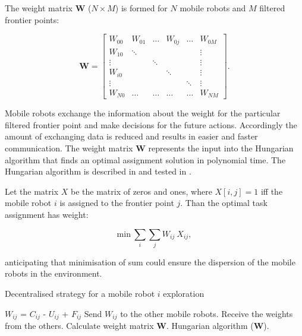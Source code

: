 \documentclass[letterpaper, 10 pt, conference]{ieeeconf}  %
\begin{document}
The weight matrix $\boldsymbol{W}$ ($N\times M$) is formed for $N$ mobile robots and $M$ filtered frontier points: 

\begin{equation}
    \boldsymbol{W} = \begin{bmatrix}
    W_{00} & W_{01} & \hdots & W_{0j} & \hdots & W_{0M}\\
    W_{10} & \ddots & & & & \vdots\\
    \vdots & & \ddots & & &  \vdots \\
    W_{i0} & & & \ddots & & \vdots \\
    \vdots & & & & \ddots & \vdots\\
    W_{N0} & \hdots  & \hdots  & \hdots  & \hdots &    W_{NM}
    \end{bmatrix}.
\end{equation}

Mobile robots exchange the information about the weight for the particular filtered frontier point and make decisions for the future actions. Accordingly the amount of exchanging data is reduced and results in easier and faster communication.
The weight matrix $\boldsymbol{W}$ represents the input into the Hungarian algorithm that finds an optimal assignment solution in polynomial time. The Hungarian algorithm is described in \cite{hungarian} and tested in \cite{comparison}. 

Let the matrix $X$ be the matrix of zeros and ones, where $X[i,j]=1$ iff the mobile robot $i$ is assigned to the frontier point $j$.
Than the optimal task assignment has weight:

\begin{equation}
     {\mathrm{min}}\ \sum_{i} \sum_{j} W_{ij}\ X_{ij},
\end{equation}

anticipating that minimisation of sum could ensure the dispersion of the mobile robots in the environment. 

\begin{algorithm}[H]
\caption{Decentralised strategy for a mobile robot $i$ exploration}
\label{algorithm1}
\begin{algorithmic}[1]
\State\hspace{\algorithmicindent} $W_{ij}$ = $C_{ij}$ - $U_{ij}$ + $F_{ij}$
\State\hspace{\algorithmicindent} Send $W_{ij}$ to the other mobile robots.
\State \hspace{\algorithmicindent} Receive the weights from the others.
\State \hspace{\algorithmicindent} Calculate weight matrix $\boldsymbol{W}$.
\State \hspace{\algorithmicindent} Hungarian algorithm ($\boldsymbol{W}$).
\EndFor
\end{algorithmic}
\end{algorithm}
\end{document}
